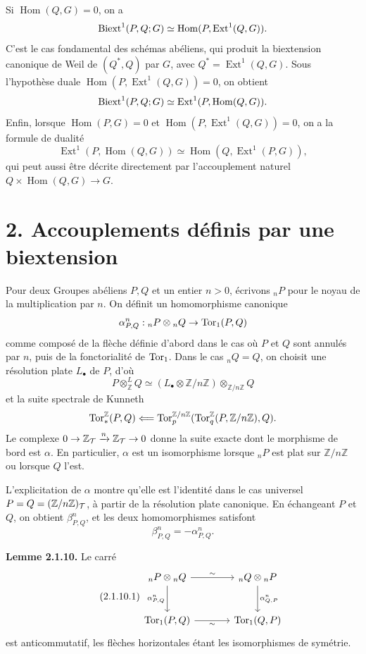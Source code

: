 \documentclass[11pt]{article}
\providecommand{\Hom}{\operatorname{Hom}}
\providecommand{\Ext}{\operatorname{Ext}}
\begin{document}
Si \(\Hom(Q,G)=0\), on a
\[
        \Biext^1(P,Q;G)\simeq\Hom(P,\Ext^1(Q,G)).
\]
C'est le cas fondamental des schémas abéliens, qui produit la biextension canonique de Weil de \((Q^*,Q)\) par \(G\), avec \(Q^*=\Ext^1(Q,G)\).  Sous l'hypothèse duale \(\Hom(P,\Ext^1(Q,G))=0\), on obtient
\[
        \Biext^1(P,Q;G)\simeq \Ext^1(P,\Hom(Q,G)).
\]
Enfin, lorsque \(\Hom(P,G)=0\) et \(\Hom(P,\Ext^1(Q,G))=0\), on a la formule de dualité
\[
        \Ext^1(P,\Hom(Q,G))\simeq\Hom(Q,\Ext^1(P,G)),
\]
qui peut aussi être décrite directement par l'accouplement naturel \(Q\times\Hom(Q,G)\to G\).

\section*{2. Accouplements définis par une biextension}

Pour deux Groupes abéliens \(P,Q\) et un entier \(n>0\), écrivons \({}_nP\) pour le noyau de la multiplication par \(n\).  On définit un homomorphisme canonique
\[
        \alpha^n_{P,Q}:{}_nP\otimes{}_nQ\to\operatorname{Tor}_1(P,Q)
\]
comme composé de la flèche définie d'abord dans le cas où \(P\) et \(Q\) sont annulés par \(n\), puis de la fonctorialité de \(\operatorname{Tor}_1\).  Dans le cas \({}_nQ=Q\), on choisit une résolution plate \(L_\bullet\) de \(P\), d'où
\[
        P\otimes^L_{\mathbb Z}Q\simeq
        (L_\bullet\otimes\mathbb Z/n\mathbb Z)\otimes_{\mathbb Z/n\mathbb Z}Q
\]
et la suite spectrale de Kunneth
\[
        \operatorname{Tor}_*^{\mathbb Z}(P,Q)
        \Longleftarrow
        \operatorname{Tor}_p^{\mathbb Z/n\mathbb Z}(\operatorname{Tor}_q^{\mathbb Z}(P,\mathbb Z/n\mathbb Z),Q).
\]
Le complexe \(0\to\mathbb Z_\mathcal T\xrightarrow{n}\mathbb Z_\mathcal T\to0\) donne la suite exacte dont le morphisme de bord est \(\alpha\).  En particulier, \(\alpha\) est un isomorphisme lorsque \({}_nP\) est plat sur \(\mathbb Z/n\mathbb Z\) ou lorsque \(Q\) l'est.

L'explicitation de \(\alpha\) montre qu'elle est l'identité dans le cas universel \(P=Q=(\mathbb Z/n\mathbb Z)_\mathcal T\), à partir de la résolution plate canonique.  En échangeant \(P\) et \(Q\), on obtient \(\beta^n_{P,Q}\), et les deux homomorphismes satisfont
\[
        \beta^n_{P,Q}=-\alpha^n_{P,Q}.
\]

\textbf{Lemme 2.1.10.}  Le carré
\begin{equation}\qquad\text{(2.1.10.1)}
\begin{tikzcd}[column sep=large,row sep=large]
{}_nP\otimes{}_nQ \arrow[r,"\sim"] \arrow[d,"\alpha^n_{P,Q}"']
  & {}_nQ\otimes{}_nP \arrow[d,"\alpha^n_{Q,P}"]\\
\Torop_1(P,Q) \arrow[r,"\sim"'] & \Torop_1(Q,P)
\end{tikzcd}
\end{equation}
est anticommutatif, les flèches horizontales étant les isomorphismes de symétrie.
\end{document}
